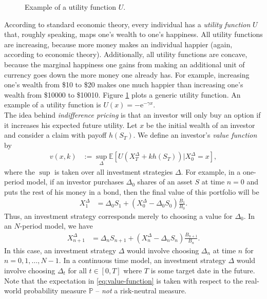 \documentclass[12pt]{book}
\numberwithin{equation}{chapter}
\theoremstyle{plain}
\numberwithin{theorem}{section}
\theoremstyle{definition}
\numberwithin{exercise}{chapter}
\newcommand{\<}{\langle}
\renewcommand{\>}{\rangle}
\renewcommand{\(}{\left(}
\renewcommand{\)}{\right)}
\renewcommand{\[}{\left[}
\renewcommand{\]}{\right]}
\newcommand\Eb{\mathds{E}}
\newcommand\Pb{\mathds{P}}
\newcommand\Del{\Delta}
\newcommand\ee{\mathrm{e}}
\theoremstyle{definition}
\numberwithin{question}{section}
\begin{document}
\begin{figure}
    \centering
    \caption{Example of a utility function $U$.\label{fig:plot2_1}}
\end{figure}

According to standard economic theory, every individual has a \textit{utility function} $U$ that, roughly speaking, maps one's wealth to one's happiness.
All utility functions are increasing, because more money makes an individual happier (again, according to economic theory).
Additionally, all utility functions are concave, because the marginal happiness one gains from making an additional unit of currency goes down the more money one already has.  For example, increasing one's wealth from \$10 to \$20 makes one much happier than increasing one's wealth from \$10000 to \$10010.  
Figure \ref{fig:plot2_1} plots a generic utility function.
An example of a utility function is $U(x) = -\ee^{-\gamma x}$.
\\[0.5em]
The idea behind \textit{indifference pricing} is that an investor will only buy an option if it increases his expected future utility.
 Let $x$ be the initial wealth of an investor and consider a claim with payoff $h(S_T)$.  We define an investor's \textit{value function} by
\begin{align}
v(x,k) 
	&:= \sup_{\Del} \Eb \[ U(X_T^\Delta + k h(S_T)) | X_0^\Del = x \], \label{eq:value-function}
\end{align}
where the $\sup$ is taken over all investment strategies $\Del$.  For example, in a one-period model, if an investor purchases $\Del_0$ shares of an asset $S$ at time $n=0$ and puts the rest of his money in a bond, then the final value of this portfolio will be
\begin{align}
X_1^\Del
	&=	\Del_0 S_1 + (X_0^\Del - \Del_0 S_0 ) \frac{B_1}{B_0} .
\end{align} 
Thus, an investment strategy corresponds merely to choosing a value for $\Del_0$.
In an $N$-period model, we have
\begin{align}
X_{n+1}^\Del
	&=	\Del_n S_{n+1} + (X_n^\Del - \Del_n S_n ) \frac{B_{n+1}}{B_n} .
\end{align}
In this case, an investment strategy $\Del$ would involve choosing $\Del_n$ at time $n$ for $n=0, 1, \ldots, N-1$.
In a continuous time model, an investment strategy $\Del$ would involve choosing $\Del_t$ for all $t \in [0,T]$ where $T$ is some target date in the future.
\\[0.5em]
Note that the expectation in \eqref{eq:value-function} is taken with respect to the real-world probability measure $\Pb$ -- \textit{not} a risk-neutral measure.
\end{document}
